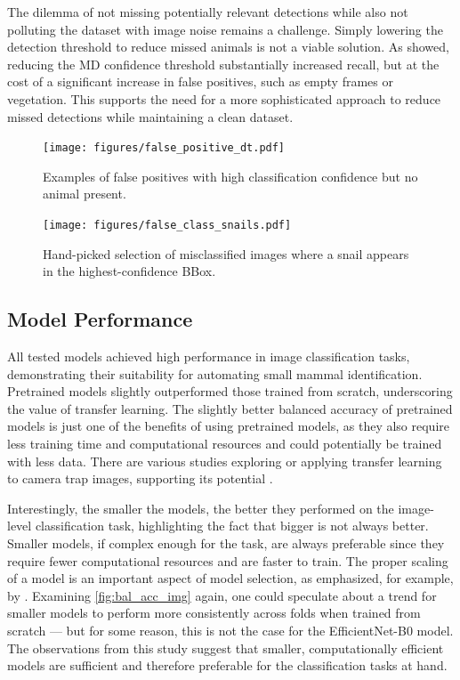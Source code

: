 The dilemma of not missing potentially relevant detections while also not polluting the dataset with image noise remains a challenge.
Simply lowering the detection threshold to reduce missed animals is not a viable solution.
As \textcite{leornaHumanVsMachine2022} showed, reducing the \ac{MD} confidence threshold substantially increased recall, but at the cost of a significant increase in false positives, such as empty frames or vegetation.
This supports the need for a more sophisticated approach to reduce missed detections while maintaining a clean dataset.

\begin{figure}[ht]
\centering
\texttt{[image: figures/false\_positive\_dt.pdf]}
\caption{Examples of false positives with high classification confidence but no animal present.}
\label{fig:false_positive_dt}
\end{figure}

\begin{figure}[ht]
\centering
\texttt{[image: figures/false\_class\_snails.pdf]}
\caption{Hand-picked selection of misclassified images where a snail appears in the highest-confidence BBox.}
\label{fig:false_class_snails}
\end{figure}

\subsection{Model Performance}
All tested models achieved high performance in image classification tasks, demonstrating their suitability for automating small mammal identification.
Pretrained models slightly outperformed those trained from scratch, underscoring the value of transfer learning.
The slightly better balanced accuracy of pretrained models is just one of the benefits of using pretrained models, as they also require less training time and computational resources and could potentially be trained with less data.
There are various studies exploring or applying transfer learning to camera trap images, supporting its potential \autocite{stancicClassificationEfficiencyPreTrained2022,hopkinsDetectingMonitoringRodents2024,doanWildlifeSpeciesClassification2024,rameshExploringGeneralizabilityTransfer2025,beeryRecognitionTerraIncognita2018}.

Interestingly, the smaller the models, the better they performed on the image-level classification task, highlighting the fact that bigger is not always better.
Smaller models, if complex enough for the task, are always preferable since they require fewer computational resources and are faster to train.
The proper scaling of a model is an important aspect of model selection, as emphasized, for example, by \textcite{tanEfficientNetRethinkingModel2019}.
Examining \autoref{fig:bal_acc_img} again, one could speculate about a trend for smaller models to perform more consistently across folds when trained from scratch --- but for some reason, this is not the case for the EfficientNet-B0 model.
The observations from this study suggest that smaller, computationally efficient models are sufficient and therefore preferable for the classification tasks at hand.


